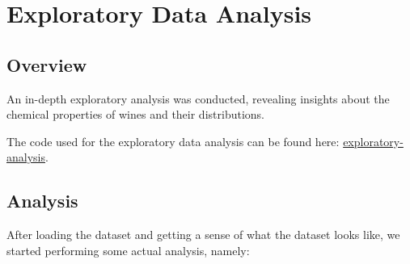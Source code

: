 \documentclass{article}
\begin{document}
\section{Exploratory Data Analysis}
\subsection{Overview}
An in-depth exploratory analysis was conducted, revealing insights about the chemical properties of wines and their distributions.

The code used for the exploratory data analysis can be found here: \href{https://github.com/hjoaquim/applied-ai/blob/main/wine-analysis/exploratory-analysis.ipynb}{exploratory-analysis}.

\subsection{Analysis}

After loading the dataset and getting a sense of what the dataset looks like, we started performing some actual analysis, namely:
\end{document}
